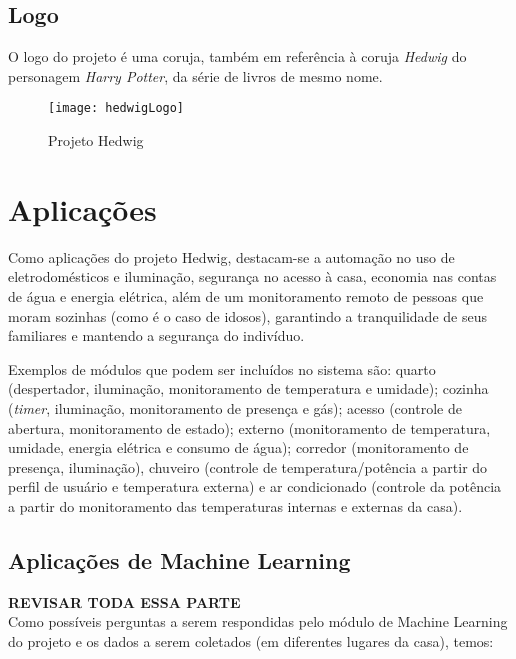\subsection{Logo}
O logo do projeto é uma coruja, também em referência à coruja \textit{Hedwig} do personagem \textit{Harry Potter}, da série de livros de mesmo nome.
\begin{figure}[H]
	\centering
	\caption{Projeto Hedwig}
  \texttt{[image: hedwigLogo]}
\label{fig:hedwigLogo}
\end{figure}

\section{Aplicações}
Como aplicações do projeto Hedwig, destacam-se a automação no uso de eletrodomésticos e iluminação, segurança no acesso à casa, economia nas contas de água e energia elétrica, além de um monitoramento remoto de pessoas que moram sozinhas (como é o caso de idosos), garantindo a tranquilidade de seus familiares e mantendo a segurança do indivíduo.

Exemplos de módulos que podem ser incluídos no sistema são: quarto (despertador, iluminação, monitoramento de temperatura e umidade); cozinha (\textit{timer}, iluminação, monitoramento de presença e gás); acesso (controle de abertura, monitoramento de estado); externo (monitoramento de temperatura, umidade, energia elétrica e consumo de água); corredor (monitoramento de presença, iluminação), chuveiro (controle de temperatura\slash potência a partir do perfil de usuário e temperatura externa) e ar condicionado (controle da potência a partir do monitoramento das temperaturas internas e externas da casa).

\subsection{Aplicações de Machine Learning}
\textbf{REVISAR TODA ESSA PARTE}\\
Como possíveis perguntas a serem respondidas pelo módulo de Machine Learning do projeto e os dados a serem coletados (em diferentes lugares da casa), temos:

